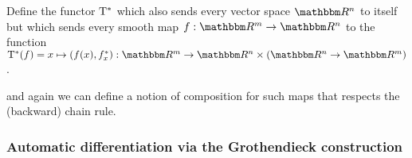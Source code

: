 \begin{definition}
Define the functor $\mathrm{T}^*$ which also sends every vector space $\RR^n$ to itself but which sends every
smooth map $f: \RR^m \to \RR^n$ to the function $\tangents^*(f) = x \mapsto (f(x), \pullf{f}_x): \RR^m \to
\RR^n \times (\RR^n \to \RR^m)$.
\end{definition}

\noindent and again we can define a notion of composition for such maps that respects the (backward) chain
rule.

\subsubsection{Automatic differentiation via the Grothendieck construction}

